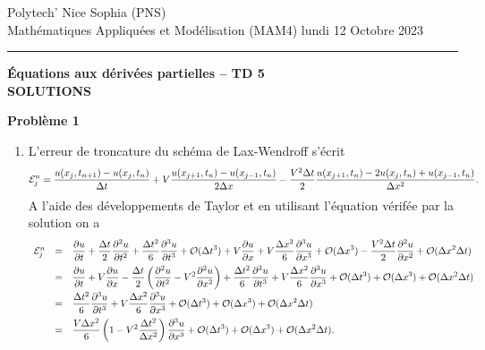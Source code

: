 \documentclass[12pt,a4paper]{article}
\begin{document}
 \hfill Polytech' Nice Sophia (PNS)\\
\noindent Math\'ematiques Appliqu\'ees et Mod\'elisation (MAM4) \hfill lundi 12 Octobre 2023 \\
\hrule

\bigskip
\bigskip

\begin{center}{\bf \'Equations aux d\'eriv\'ees partielles --
TD 5 \\
SOLUTIONS}\end{center}

\bigskip

{\bf Probl\`eme 1}
\begin{enumerate}
\item L'erreur de troncature du sch\'ema de Lax-Wendroff s'\'ecrit
$$
{\cal E}^n_j=\frac{u(x_{j},t_{n+1})-u(x_j,t_n)}{\Delta
  t}+V\frac{u(x_{j+1},t_{n})-u(x_{j-1},t_n)}{2\Delta
  x}-\frac{V^2\Delta t}{2}\frac{u(x_{j+1},t_n)-2
  u(x_{j},t_n)+u(x_{j-1},t_n)}{\Delta x^2}.
$$
A l'aide des d\'eveloppements de Taylor et en utilisant l'\'equation
v\'erif\'ee par la solution on a
$$
\begin{array}{lcl}
{\cal E}^n_j &=&\displaystyle\frac{\partial u}{\partial t}+\frac{\Delta
  t}{2}\frac{\partial^2 u}{\partial t^2} + \frac{\Delta
  t^2}{6}\frac{\partial^3 u}{\partial t^3} + {\cal O} (\Delta t^3) + V \frac{\partial u}{\partial x}+V\frac{\Delta
  x^2}{6}\frac{\partial^3 u}{\partial x^3}+ {\cal O} (\Delta x^3) -\displaystyle \frac{V^2\Delta t}{2} \frac{\partial^2
  u}{\partial x^2} +  {\cal O} (\Delta x^2\Delta t)\\[2ex]
& = & \displaystyle \frac{\partial u}{\partial t}+V\frac{\partial
  u}{\partial x}-\frac{\Delta t}{2}\left(\frac{\partial^2 u}{\partial
    t^2}-V^2 \frac{\partial^2 u}{\partial x^2}\right)+ \frac{\Delta
  t^2}{6}\frac{\partial^3 u}{\partial t^3} + V\frac{\Delta
  x^2}{6}\frac{\partial^3 u}{\partial x^3} + {\cal O} (\Delta t^3) +{\cal O} (\Delta x^3) +  {\cal O} (\Delta x^2\Delta t) \\[2ex]
& = & \displaystyle\frac{\Delta
  t^2}{6}\frac{\partial^3 u}{\partial t^3} + V\frac{\Delta
  x^2}{6}\frac{\partial^3 u}{\partial x^3} + {\cal O} (\Delta t^3)
+{\cal O} (\Delta x^3) +  {\cal O} (\Delta x^2\Delta t) \\[2ex]
&=& \displaystyle\frac{V \Delta x^2}{6}\left(1-V^2\frac{\Delta t^2}{\Delta x^2}\right) \frac{\partial^3 u}{\partial x^3}+{\cal O} (\Delta t^3)
+{\cal O} (\Delta x^3) +  {\cal O} (\Delta x^2\Delta t).
\end{array} 
$$
\end{enumerate}
\end{document}
